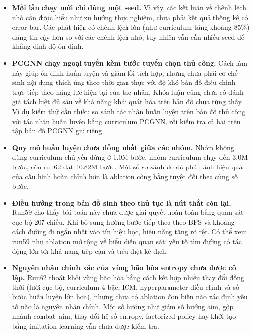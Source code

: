 \begin{itemize}
    \item \textbf{Mỗi lần chạy mới chỉ dùng một seed.} Vì vậy, các kết luận về chênh lệch nhỏ cần được hiểu như xu hướng thực nghiệm, chưa phải kết quả thống kê có error bar. Các phát hiện có chênh lệch lớn (như curriculum tăng khoảng 85\%) đáng tin cậy hơn so với các chênh lệch nhỏ; tuy nhiên vẫn cần nhiều seed để khẳng định độ ổn định.

    \item \textbf{PCGNN chạy ngoại tuyến kèm bước tuyển chọn thủ công.} Cách làm này giúp ổn định huấn luyện và giảm lỗi tích hợp, nhưng chưa phải cơ chế sinh nội dung thích ứng theo thời gian thực với độ khó bản đồ điều chỉnh trực tiếp theo năng lực hiện tại của tác nhân. Khóa luận cũng chưa có đánh giá tách biệt đủ sâu về khả năng khái quát hóa trên bản đồ chưa từng thấy. Ví dụ kiểm thử cần thiết: so sánh tác nhân huấn luyện trên bản đồ thủ công với tác nhân huấn luyện bằng curriculum PCGNN, rồi kiểm tra cả hai trên tập bản đồ PCGNN giữ riêng.

    \item \textbf{Quy mô huấn luyện chưa đồng nhất giữa các nhóm.} Nhóm không dùng curriculum chủ yếu dừng ở 1.0M bước, nhóm curriculum chạy đến 3.0M bước, còn run62 đạt 40.82M bước. Một số so sánh do đó phản ánh hiệu quả của cấu hình hoàn chỉnh hơn là ablation công bằng tuyệt đối theo cùng số bước.

    \item \textbf{Điều hướng trong bản đồ sinh theo thủ tục là nút thắt còn lại.} Run59 cho thấy bài toán này chưa được giải quyết hoàn toàn bằng quan sát cục bộ 207 chiều. Khi bổ sung hướng bước tiếp theo theo BFS và khoảng cách đường đi ngắn nhất vào tín hiệu học, hiệu năng tăng rõ rệt. Có thể xem run59 như ablation mở rộng về biểu diễn quan sát: yếu tố tìm đường có tác động lớn tới khả năng tiếp cận và tiêu diệt kẻ địch.

    \item \textbf{Nguyên nhân chính xác của vùng bão hòa entropy chưa được cô lập.} Run62 thoát khỏi vùng bão hòa bằng cách kết hợp nhiều thay đổi đồng thời (lưới cục bộ, curriculum 4 bậc, ICM, hyperparameter điều chỉnh và số bước huấn luyện lớn hơn), nhưng chưa có ablation đơn biến nào xác định yếu tố nào là nguyên nhân chính. Một số hướng như giảm số hướng aim, gộp nhánh combat--aim, thay đổi hệ số entropy, factorized policy hay khởi tạo bằng imitation learning vẫn chưa được kiểm tra.
\end{itemize}

